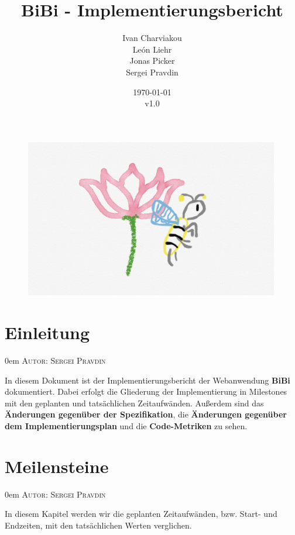 \documentclass{article}
\title{BiBi - Implementierungsbericht}
\date{\today\\v1.0}
\author{
	Ivan Charviakou\\
	León Liehr\\
	Jonas Picker\\
	Sergei Pravdin
}
\makeatletter
\newcommand{\sectionauthor}[1]{
	{\parindent 0em \large \scshape Autor: #1 \par \nobreak \vspace*{1em}}
	\@afterheading
}
\makeatother
\begin{document}
\maketitle
\begin{figure}[H]
	\centering
	\includegraphics[width = 30em]{Logo}
\end{figure}
\newpage
\tableofcontents
\newpage

\section{Einleitung}
\sectionauthor{Sergei Pravdin}
In diesem Dokument ist der Implementierungsbericht der Webanwendung \textbf{BiBi} dokumentiert. Dabei erfolgt die Gliederung der Implementierung in Milestones mit den geplanten und tatsächlichen Zeitaufwänden. Außerdem sind das \textbf{Änderungen gegenüber der Spezifikation}, die \textbf{Änderungen gegenüber dem Implementierungsplan} und die \textbf{Code-Metriken} zu sehen.

\section{Meilensteine}
\sectionauthor{Sergei Pravdin}
In diesem Kapitel werden wir die geplanten Zeitaufwänden, bzw. Start- und Endzeiten, mit den tatsächlichen Werten verglichen.
\end{document}
